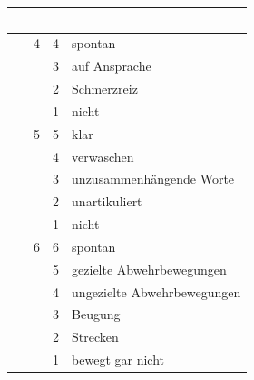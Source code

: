 \begin{tabulary}{\linewidth}{LCCL}\addlinespace\toprule\addlinespace
\noindent ~ & \noindent{} & 
\noindent{} &
\noindent{}
\\\midrule
\noindent{} & 4 & 4 & spontan
\\
 & & 3 & auf Ansprache
\\
 & & 2 & Schmerzreiz
\\
 & & 1 & nicht
\\\midrule
\noindent{} & 5 & 5 & klar
\\
 & & 4 & verwaschen
\\
 & & 3 & unzusammenhängende Worte
\\
 & & 2 & unartikuliert
\\
 & & 1 & nicht
\\\midrule
\noindent{} & 6 & 6 & spontan
\\
 & & 5 & gezielte Abwehrbewegungen
\\
 & & 4 & ungezielte Abwehrbewegungen
\\
 & & 3 & Beugung
\\
 & & 2 & Strecken
\\
 & & 1  & bewegt gar nicht
\\\bottomrule
\end{tabulary}